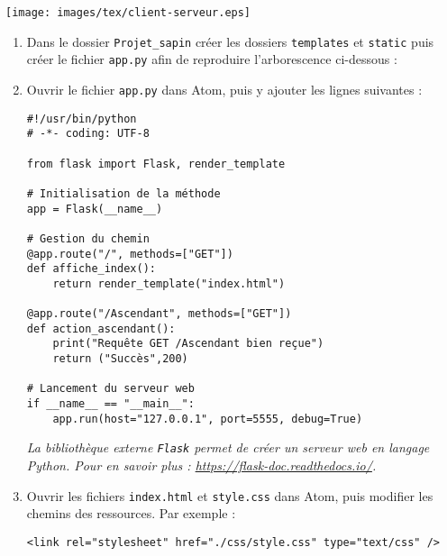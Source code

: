 \documentclass[a4paper]{article}
\begin{document}
\begin{center}
  \texttt{[image: images/tex/client-serveur.eps]}
\end{center}

\activite
\begin{enumerate}
  \item Dans le dossier \verb|Projet_sapin| créer les dossiers \verb|templates| et \verb|static| puis créer le fichier \verb|app.py| afin de reproduire l'arborescence ci-dessous :

    \begin{center}
    \end{center}
  \item Ouvrir le fichier \verb|app.py| dans Atom, puis y ajouter les lignes suivantes :

	\begin{verbatim}
#!/usr/bin/python
# -*- coding: UTF-8

from flask import Flask, render_template

# Initialisation de la méthode
app = Flask(__name__)

# Gestion du chemin
@app.route("/", methods=["GET"])
def affiche_index():
    return render_template("index.html")

@app.route("/Ascendant", methods=["GET"])
def action_ascendant():
    print("Requête GET /Ascendant bien reçue")
    return ("Succès",200)

# Lancement du serveur web
if __name__ == "__main__":
    app.run(host="127.0.0.1", port=5555, debug=True)
	\end{verbatim}

    {\itshape La bibliothèque externe \verb|Flask| permet de créer un serveur web en langage Python. Pour en savoir plus : \url{https://flask-doc.readthedocs.io/}.}
  \item Ouvrir les fichiers \verb|index.html| et \verb|style.css| dans Atom, puis modifier les chemins des ressources. Par exemple :

	\begin{verbatim}
<link rel="stylesheet" href="./css/style.css" type="text/css" />
	\end{verbatim}


\end{enumerate}
\end{document}
